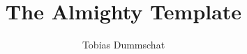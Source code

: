 \documentclass[11pt]{article}
\title{The Almighty Template}
\author{Tobias Dummschat}
\begin{document}
{\let\newpage\relax\maketitle}



\myDisclaimer
\end{document}
